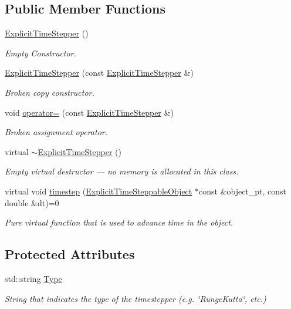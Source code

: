\subsection*{Public Member Functions}
\begin{DoxyCompactItemize}
\item 
\hyperlink{classoomph_1_1ExplicitTimeStepper_a4b54826f4098eae55da1ee7fd51b634d}{Explicit\+Time\+Stepper} ()
\begin{DoxyCompactList}\small\item\em Empty Constructor. \end{DoxyCompactList}\item 
\hyperlink{classoomph_1_1ExplicitTimeStepper_ab2c6e0a9f8e620f7b3847ad46d297ad2}{Explicit\+Time\+Stepper} (const \hyperlink{classoomph_1_1ExplicitTimeStepper}{Explicit\+Time\+Stepper} \&)
\begin{DoxyCompactList}\small\item\em Broken copy constructor. \end{DoxyCompactList}\item 
void \hyperlink{classoomph_1_1ExplicitTimeStepper_abed621c80844df126c29b8862092cb97}{operator=} (const \hyperlink{classoomph_1_1ExplicitTimeStepper}{Explicit\+Time\+Stepper} \&)
\begin{DoxyCompactList}\small\item\em Broken assignment operator. \end{DoxyCompactList}\item 
virtual \hyperlink{classoomph_1_1ExplicitTimeStepper_a51f659328a57063563b7344c8b9d7737}{$\sim$\+Explicit\+Time\+Stepper} ()
\begin{DoxyCompactList}\small\item\em Empty virtual destructor --- no memory is allocated in this class. \end{DoxyCompactList}\item 
virtual void \hyperlink{classoomph_1_1ExplicitTimeStepper_ab43bbab17960d0f50b8842e996f5c765}{timestep} (\hyperlink{classoomph_1_1ExplicitTimeSteppableObject}{Explicit\+Time\+Steppable\+Object} $\ast$const \&object\+\_\+pt, const double \&dt)=0
\begin{DoxyCompactList}\small\item\em Pure virtual function that is used to advance time in the object. \end{DoxyCompactList}\end{DoxyCompactItemize}
\subsection*{Protected Attributes}
\begin{DoxyCompactItemize}
\item 
std\+::string \hyperlink{classoomph_1_1ExplicitTimeStepper_aa923e120e84dc7cec56d2a50f5b33421}{Type}
\begin{DoxyCompactList}\small\item\em String that indicates the type of the timestepper (e.\+g. \char`\"{}\+Runge\+Kutta\char`\"{}, etc.) \end{DoxyCompactList}\end{DoxyCompactItemize}


